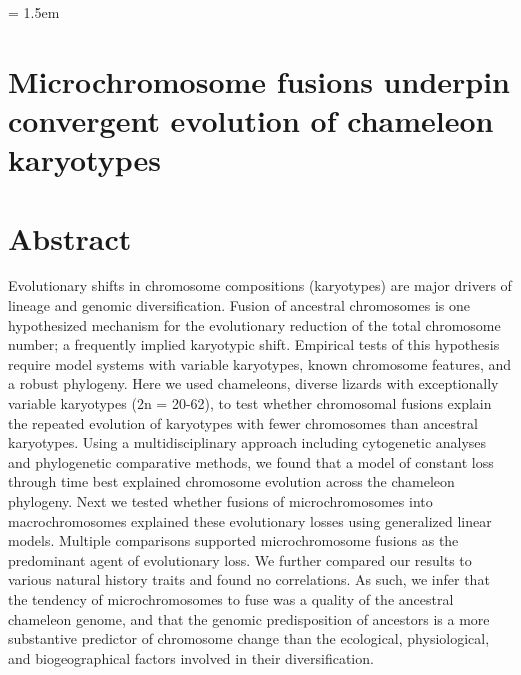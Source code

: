 \documentclass[a4paper, 12pt]{article}
\begin{document}
\modulolinenumbers[1]   %


\parindent = 1.5em
\addtolength{\parskip}{.9em}

\raggedright


\section{Microchromosome fusions underpin convergent evolution of chameleon karyotypes}

\newpage
\section{Abstract}

Evolutionary shifts in chromosome compositions (karyotypes) are major drivers of lineage and genomic diversification. 
Fusion of ancestral chromosomes is one hypothesized mechanism for the evolutionary reduction of the total chromosome number; a frequently implied karyotypic shift. 
Empirical tests of this hypothesis require model systems with variable karyotypes, known chromosome features, and a robust phylogeny. 
Here we used chameleons, diverse lizards with exceptionally variable karyotypes (2n = 20-62), to test whether chromosomal fusions explain the repeated evolution of karyotypes with fewer chromosomes than ancestral karyotypes. 
Using a multidisciplinary approach including cytogenetic analyses and phylogenetic comparative methods, we found that a model of constant loss through time best explained chromosome evolution across the chameleon phylogeny. 
Next we tested whether fusions of microchromosomes into macrochromosomes explained these evolutionary losses using generalized linear models. 
Multiple comparisons supported microchromosome fusions as the predominant agent of evolutionary loss. 
We further compared our results to various natural history traits and found no correlations. 
As such, we infer that the tendency of microchromosomes to fuse was a quality of the ancestral chameleon genome, and that the genomic predisposition of ancestors is a more substantive predictor of chromosome change than the ecological, physiological, and biogeographical factors involved in their diversification.
\end{document}
